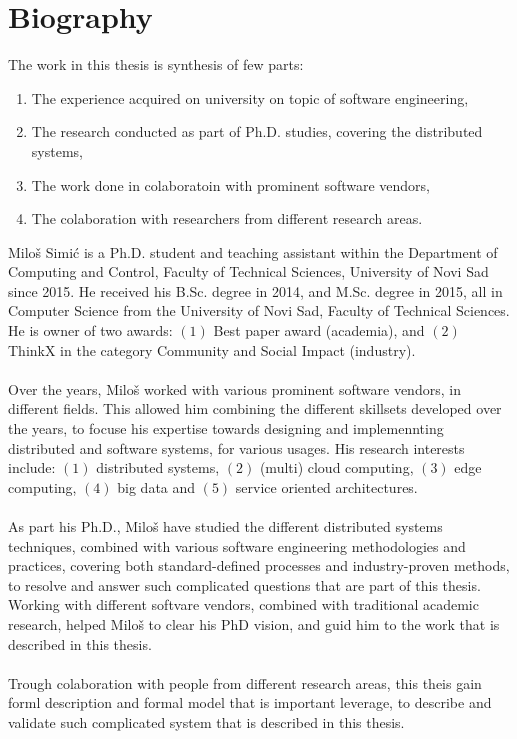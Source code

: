 \chapter*{Biography}

The work in this thesis is synthesis of few parts:

\begin{enumerate}[start=1,label={(\bfseries \arabic*)}]
	\item The experience acquired on university on topic of software engineering,
	\item The research conducted as part of Ph.D. studies, covering the distributed systems,
	\item The work done in colaboratoin with prominent software vendors,
	\item The colaboration with researchers from different research areas.
\end{enumerate}

\noindent
Milo\v s Simi\'c is a Ph.D. student and teaching assistant within the Department of Computing and Control, Faculty of Technical Sciences, University of Novi Sad since 2015. He received his B.Sc. degree in 2014, and M.Sc. degree in 2015, all in Computer Science from the University of Novi Sad, Faculty of Technical Sciences. He is owner of two awards: $(1)$ Best paper award (academia), and $(2)$ ThinkX in the category Community and Social Impact (industry).\\\\ 
\noindent
Over the years, Milo\v s worked with various prominent software vendors, in different fields. This allowed him combining the different skillsets developed over the years, to focuse his expertise towards designing and implemennting distributed and software systems, for various usages. His research interests include: $(1)$ distributed systems, $(2)$ (multi) cloud computing, $(3)$ edge computing, $(4)$ big data and $(5)$ service oriented architectures.\\\\
\noindent
As part his Ph.D., Milo\v s have studied the different distributed systems techniques, combined with various software engineering methodologies and practices, covering both standard-defined processes and industry-proven methods, to resolve and answer such complicated questions that are part of this thesis. Working with different softvare vendors, combined with traditional academic research, helped Milo\v s to clear his PhD vision, and guid him to the work that is described in this thesis.\\\\
\noindent
Trough colaboration with people from different research areas, this theis gain forml description and formal model that is important leverage, to describe and validate such complicated system that is described in this thesis.